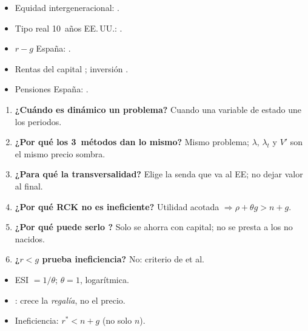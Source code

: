 \documentclass{article}
\begin{document}
\begin{columnas}
\anexorepaso
{}
\begin{itemize}
\item Equidad intergeneracional: .
\item Tipo real 10~años EE.\,UU.: .
\item $r-g$ España: .
\item Rentas del capital ; inversión .
\item Pensiones España: .
\end{itemize}
\begin{enumerate}
\item \textbf{¿Cuándo es dinámico un problema?} Cuando una variable de estado une los periodos.
\item \textbf{¿Por qué los 3~métodos dan lo mismo?} Mismo problema; $\lambda$, $\lambda_t$ y $V'$ son el mismo precio sombra.
\item \textbf{¿Para qué la transversalidad?} Elige la senda que va al EE; no dejar valor al final.
\item \textbf{¿Por qué RCK no es ineficiente?} Utilidad acotada $\Rightarrow\rho+\theta g>n+g$.
\item \textbf{¿Por qué puede serlo ?} Solo se ahorra con capital; no se presta a los no nacidos.
\item \textbf{¿$r<g$ prueba ineficiencia?} No: criterio de  et al.
\end{enumerate}
\begin{trampa}
\begin{itemize}
\item ESI $=1/\theta$; $\theta=1$, logarítmica.
\item {}: crece la \emph{regalía}, no el precio.
\item Ineficiencia: $r^*<n+g$ (no solo $n$).

\end{itemize}
\end{trampa}
\end{columnas}
\end{document}
